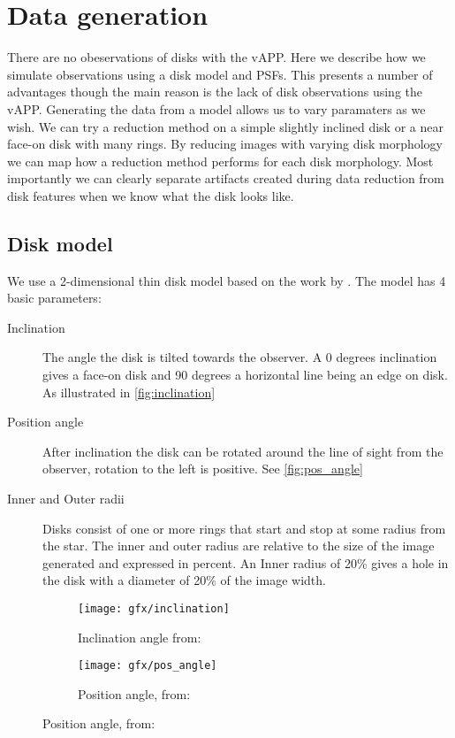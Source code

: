 
\chapter{Data generation} %
\label{ch:data_gen} %

There are no obeservations of disks with the \ac{vAPP}. Here we describe how we simulate observations using a disk model and \acp{PSF}. This presents a number of advantages though the main reason is the lack of disk observations using the \ac{vAPP}. Generating the data from a model allows us to vary paramaters as we wish. We can try a reduction method on a simple slightly inclined disk or a near face-on disk with many rings. By reducing images with varying disk morphology we can map how a reduction method performs for each disk morphology. Most importantly we can clearly separate artifacts created during data reduction from disk features when we know what the disk looks like.




\section{Disk model}
We use a 2-dimensional thin disk model based on the work by \cite{Pieter_Okko}. The model has 4 basic parameters: 

\begin{description}
\item[Inclination] The angle the disk is tilted towards the observer. A 0 degrees inclination gives a face-on disk and 90 degrees a horizontal line being an edge on disk. As illustrated in \autoref{fig:inclination}
\item[Position angle] After inclination the disk can be rotated around the line of sight from the observer, rotation to the left is positive. See \autoref{fig:pos_angle}
\item[Inner and Outer radii] Disks consist of one or more rings that start and stop at some radius from the star. The inner and outer radius are relative to the size of the image generated and expressed in percent. An Inner radius of 20\% gives a hole in the disk with a diameter of 20\% of the image width. %
\end{description}

\begin{figure}[h!]
  \centering
  \begin{subfigure}[b]{0.4\textwidth}
    \texttt{[image: gfx/inclination]}
    \caption{Inclination angle from: \cite{Pieter_Okko}}
    \label{fig:pos_angle}

  \end{subfigure}
  \begin{subfigure}[b]{0.4\textwidth}
    \texttt{[image: gfx/pos\_angle]}
    \caption{Position angle, from: \cite{Pieter_Okko}}
    \label{fig:inclination}
  \end{subfigure}
  \label{fig:1}
\end{figure}

